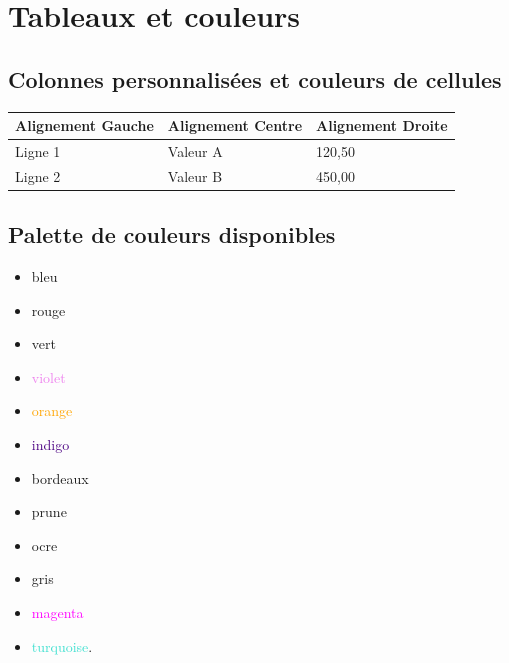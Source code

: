 \documentclass{poly}
\begin{document}
\section{Tableaux et couleurs}

\subsection{Colonnes personnalisées et couleurs de cellules}
\begin{center}
	\def\arraystretch{1.5}
	\begin{tabular}{|L{4cm}|C{5cm}|R{5cm}|} \hline
		\ccg Alignement Gauche      &  Alignement Centre &  Alignement Droite \\ \hline
		 Ligne 1      &  Valeur A        &  120,50 \eur      \\ \hline
		 Ligne 2 &  Valeur B          &  450,00 \eur        \\ \hline
	\end{tabular}
\end{center}

\newpage

\subsection{Palette de couleurs disponibles}
\begin{multicols}{4}
	\begin{itemize}
		\item \textcolor{bleu}{bleu}
		\item \textcolor{rouge}{rouge}
		\item \textcolor{vert}{vert}
		\item \textcolor{violet}{violet}
		\item \textcolor{orange}{orange}
		\item \textcolor{indigo}{indigo}
		\item \textcolor{bordeaux}{bordeaux}
		\item \textcolor{prune}{prune}
		\item \textcolor{ocre}{ocre}
		\item \textcolor{gris}{gris}
		\item \textcolor{magenta}{magenta}
		\item \textcolor{turquoise}{turquoise}.
	\end{itemize}
\end{multicols}
\end{document}
